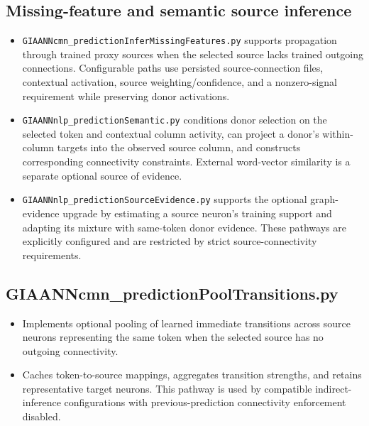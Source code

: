 \subsection{Missing-feature and semantic source inference}
\begin{itemize}
	\item \texttt{GIAANNcmn\_predictionInferMissingFeatures.py} supports propagation through trained proxy sources when the selected source lacks trained outgoing connections. Configurable paths use persisted source-connection files, contextual activation, source weighting/confidence, and a nonzero-signal requirement while preserving donor activations.
	\item \texttt{GIAANNnlp\_predictionSemantic.py} conditions donor selection on the selected token and contextual column activity, can project a donor's within-column targets into the observed source column, and constructs corresponding connectivity constraints. External word-vector similarity is a separate optional source of evidence.
	\item \texttt{GIAANNnlp\_predictionSourceEvidence.py} supports the optional graph-evidence upgrade by estimating a source neuron's training support and adapting its mixture with same-token donor evidence. These pathways are explicitly configured and are restricted by strict source-connectivity requirements.
\end{itemize}

\subsection{GIAANNcmn\_predictionPoolTransitions.py}
\begin{itemize}
	\item Implements optional pooling of learned immediate transitions across source neurons representing the same token when the selected source has no outgoing connectivity.
	\item Caches token-to-source mappings, aggregates transition strengths, and retains representative target neurons. This pathway is used by compatible indirect-inference configurations with previous-prediction connectivity enforcement disabled.
\end{itemize}

